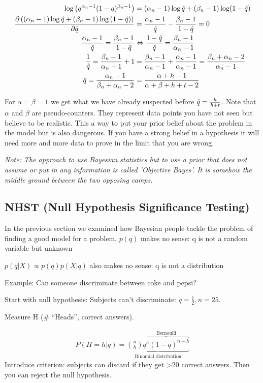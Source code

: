 \begin{align*}
\log{\left(q^{\alpha_n-1}(1-q)^{\beta_n-1}\right)} &= (\alpha_n-1)\log \est{q} + (\beta_n-1)\log (1-\est{q}) \\
\frac{\partial \left(\left(\alpha_n-1\right)\log \est{q} + \left(\beta_n-1\right)\log \left(1-\est{q}\right)\right)}{\partial \est{q}} &= \frac{\alpha_n-1}{\est{q}} - \frac{\beta_n-1}{1-\est{q}} = 0 \\
\frac{\alpha_n-1}{\est{q}} = \frac{\beta_n-1}{1-\est{q}} &\Leftrightarrow \frac{1-\est{q}}{\est{q}} = \frac{\beta_n-1}{\alpha_n-1} \\
\frac{1}{\est{q}} = \frac{\beta_n-1}{\alpha_n-1}+1 &= \frac{\beta_n-1}{\alpha_n-1} + \frac{\alpha_n-1}{\alpha_n-1} = \frac{\beta_n+\alpha_n-2}{\alpha_n-1} \\
\est{q} = \frac{\alpha_n-1}{\beta_n+\alpha_n-2} &= \frac{\alpha+h-1}{\alpha+\beta+h+t-2}
\end{align*}

For $\alpha =\beta=1$ we get what we have already suspected before $\est{q}=\frac{h}{h+t}$. Note that $\alpha$ and $\beta$ are pseudo-counters. They represent data points you have not seen but believe to be realistic. This a way to put your prior belief about the problem in the model but is also dangerous. If you have a strong belief in a hypothesis it will need more and more data to prove in the limit that you are wrong.

\textit{Note: The approach to use Bayesian statistics but to use a prior that does not assume or put in any information is called 'Objective Bayes'. It is somehow the middle ground between the two opposing camps.}

\subsection{NHST (Null Hypothesis Significance Testing)}
In the previous section we examined how Bayesian people tackle the problem of finding a good model for a problem.
$p(q)$ makes no sense: q is not a random variable but unknown

$p(q|X) \propto p(q)p(X|q)$ also makes no sense: q is not a distribution

Example: Can someone discriminate between coke and pepsi?

Start with null hypothesis: Subjects can't discriminate: $q = \frac{1}{2}, n = 25$.

Measure H (\# ``Heads'', correct answers).

\begin{align*}
P(H=h|q) = \underbrace{ \binom{n}{h} \overbrace{q^h (1-q)^{n-h}}^\text{Bernoulli} }_\text{Binomial distribution}
\end{align*}
Introduce criterion: subjects can discard if they get >20 correct answers. Then you can reject the null hypothesis.

